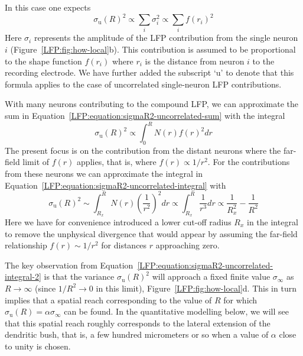 In this case one expects \citep{Linden2011}
\begin{equation}
\sigma_\text{u}(R)^2 \propto \sum_i \sigma_i^2 \propto \sum_i f(r_i)^2
\label{LFP:equation:sigmaR2-uncorrelated-sum}
\end{equation}
Here $\sigma_i$ represents the amplitude of the LFP contribution from the single 
neuron $i$ (Figure~\ref{LFP:fig:how-local}b). This contribution is assumed to 
be proportional to the shape function $f(r_i)$ where $r_i$ is the distance from neuron $i$ to the recording electrode.  
We have further added the subscript `u' to denote that this formula applies to the case of uncorrelated single-neuron LFP contributions.

With many neurons contributing to the compound LFP, we can approximate the sum in Equation~\ref{LFP:equation:sigmaR2-uncorrelated-sum}
with the integral  
\begin{equation}
\sigma_\text{u}(R)^2 \propto \int_0^R N(r) f(r)^2 dr 
\label{LFP:equation:sigmaR2-uncorrelated-integral}
\end{equation}
The present focus is on the contribution from the distant neurons where the far-field limit of $f(r)$ applies, that is, where $f(r) \propto 1/r^2$.
For the contributions from these neurons we can approximate the integral in Equation~\ref{LFP:equation:sigmaR2-uncorrelated-integral}
with 
\begin{equation}
\sigma_\text{u}(R)^2 \sim \int_{R_x}^R N(r) \left(\frac{1}{r^2}\right)^2 dr \propto \int_{R_x}^R \frac{1}{r^3} dr
\propto \frac{1}{R_x^2}-\frac{1}{R^2}
\label{LFP:equation:sigmaR2-uncorrelated-integral-2}
\end{equation}
Here we have for convenience introduced a lower cut-off radius $R_x$ in the integral to remove the unphysical divergence that would appear by
assuming the far-field relationship $f(r)\sim 1/r^2$ for distances $r$ approaching zero.

The key observation from Equation~\ref{LFP:equation:sigmaR2-uncorrelated-integral-2} is that the variance $\sigma_\text{u}(R)^2$ 
will approach a fixed finite value $\sigma_\infty$ as $R \rightarrow \infty$ (since $1/R^2 \rightarrow 0$ in this limit), Figure~\ref{LFP:fig:how-local}d.
This in turn implies that a spatial reach corresponding to the value of $R$ for which $\sigma_\text{u}(R)=\alpha \sigma_\infty$ can be found.
In the quantitative modelling below, we will see that this spatial reach roughly corresponds to the lateral extension of the dendritic bush, that is, a few hundred micrometers or so when a value of $\alpha$ close to unity is chosen.

